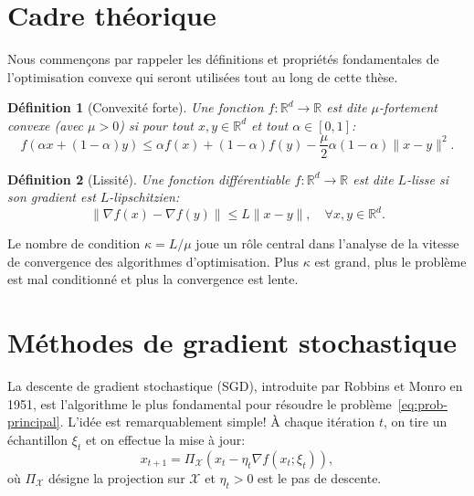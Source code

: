\documentclass[12pt,a4paper]{report}
\newtheorem{definition}{D\'efinition}[chapter]
\begin{document}
\section{Cadre th\'eorique}

Nous commen\c{c}ons par rappeler les d\'efinitions et propri\'et\'es
fondamentales de l'optimisation convexe qui seront utilis\'ees tout
au long de cette th\`ese.

\begin{definition}[Convexit\'e forte]
Une fonction $f : \mathbb{R}^d \to \mathbb{R}$ est dite
$\mu$-fortement convexe (avec $\mu > 0$) si pour tout
$x, y \in \mathbb{R}^d$ et tout $\alpha \in [0, 1]$:
\begin{equation}\label{eq:strong-cvx}
  f(\alpha x + (1-\alpha) y) \leq \alpha f(x) + (1-\alpha) f(y)
    - \frac{\mu}{2} \alpha (1-\alpha) \|x - y\|^2.
\end{equation}
\end{definition}

\begin{definition}[Lissit\'e]
Une fonction diff\'erentiable $f : \mathbb{R}^d \to \mathbb{R}$ est
dite $L$-lisse si son gradient est $L$-lipschitzien:
\begin{equation}\label{eq:lipschitz-grad}
  \|\nabla f(x) - \nabla f(y)\| \leq L \|x - y\|, \quad
  \forall x, y \in \mathbb{R}^d.
\end{equation}
\end{definition}

Le nombre de condition $\kappa = L / \mu$ joue un r\^ole central dans
l'analyse de la vitesse de convergence des algorithmes d'optimisation.
Plus $\kappa$ est grand, plus le probl\`eme est mal conditionn\'e et
plus la convergence est lente.

\section{M\'ethodes de gradient stochastique}

La descente de gradient stochastique (SGD), introduite par Robbins et
Monro en 1951, est l'algorithme le plus fondamental pour r\'esoudre le
probl\`eme~\eqref{eq:prob-principal}. L'id\'ee est remarquablement simple!
\`A chaque it\'eration $t$, on tire un \'echantillon $\xi_t$ et on
effectue la mise \`a jour:
\begin{equation}\label{eq:sgd}
  x_{t+1} = \Pi_{\mathcal{X}} \left( x_t - \eta_t \nabla f(x_t; \xi_t) \right),
\end{equation}
o\`u $\Pi_{\mathcal{X}}$ d\'esigne la projection sur $\mathcal{X}$ et
$\eta_t > 0$ est le pas de descente.
\end{document}
